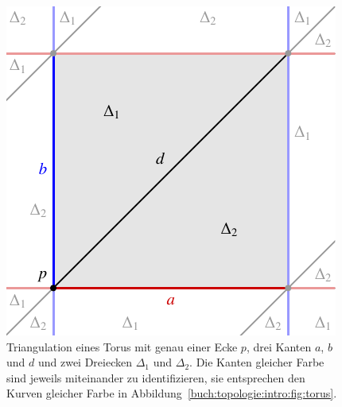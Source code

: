 %
%
%
\begin{figure}
\centering
\includegraphics{chapters/120-topologie/images/torushomologie.pdf}
\caption{Triangulation eines Torus mit genau einer Ecke $p$, drei
Kanten $a$, $b$ und $d$ und zwei Dreiecken $\Delta_1$ und $\Delta_2$.
Die Kanten gleicher Farbe sind jeweils miteinander zu identifizieren,
sie entsprechen den Kurven gleicher Farbe in
Abbildung~\ref{buch:topologie:intro:fig:torus}.
\label{buch:topologie:euler:fig:torushomologie}}
\end{figure}
